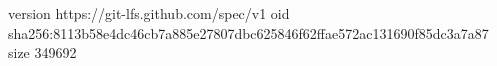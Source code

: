 version https://git-lfs.github.com/spec/v1
oid sha256:8113b58e4dc46cb7a885e27807dbc625846f62ffae572ac131690f85dc3a7a87
size 349692
